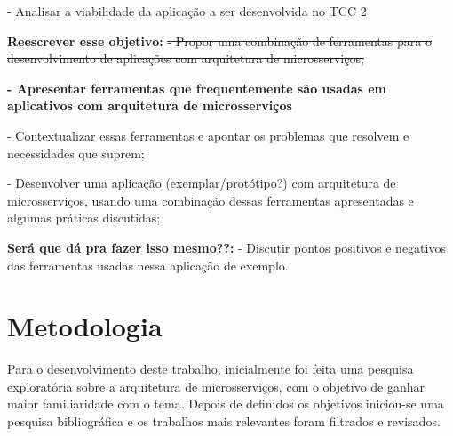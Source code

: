 - Analisar a viabilidade da aplicação a ser desenvolvida no TCC 2

\textbf{Reescrever esse objetivo:}
\sout{- Propor uma combinação de ferramentas para o desenvolvimento de aplicações com arquitetura de microsserviços;}



\textbf{- Apresentar ferramentas que frequentemente são usadas em aplicativos com arquitetura de microsserviços}

- Contextualizar essas ferramentas e apontar os problemas que resolvem e necessidades que suprem;

- Desenvolver uma aplicação (exemplar/protótipo?) com arquitetura de microsserviços, usando uma combinação dessas ferramentas apresentadas e algumas práticas discutidas;

\textbf{Será que dá pra fazer isso mesmo??:}
- Discutir pontos positivos e negativos das ferramentas usadas nessa aplicação de exemplo.

\section{Metodologia}

Para o desenvolvimento deste trabalho, inicialmente foi feita uma pesquisa exploratória sobre a arquitetura de microsserviços, com o objetivo de ganhar maior familiaridade com o tema. Depois de definidos os objetivos iniciou-se uma pesquisa bibliográfica e os trabalhos mais relevantes foram filtrados e revisados. 

